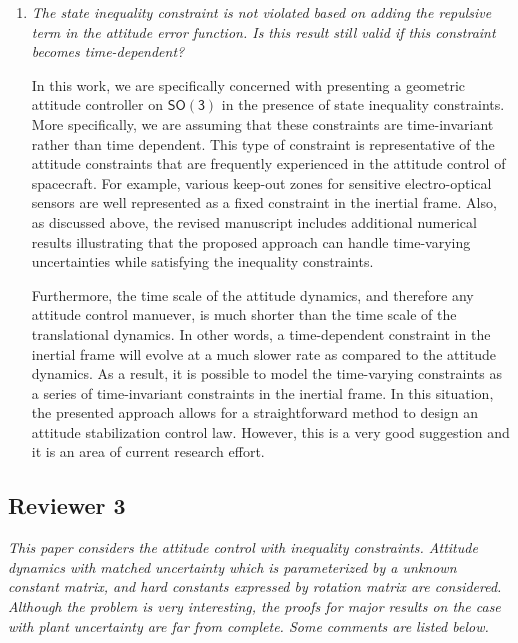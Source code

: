 \documentclass[11pt]{article}
\newcommand{\SO}{\ensuremath{\mathsf{SO(3)}}}
\begin{document}
\begin{enumerate}
\item \textit{The state inequality constraint is not violated based on adding the repulsive term in the attitude error function. Is this result still valid if this constraint becomes time-dependent?}

In this work, we are specifically concerned with presenting a geometric attitude controller on \( \SO \) in the presence of state inequality constraints.
More specifically, we are assuming that these constraints are time-invariant rather than time dependent. 
This type of constraint is representative of the attitude constraints that are frequently experienced in the attitude control of spacecraft. 
For example, various keep-out zones for sensitive electro-optical sensors are well represented as a fixed constraint in the inertial frame. 
Also, as discussed above, the revised manuscript includes additional numerical results illustrating that the proposed approach can handle time-varying uncertainties while satisfying the inequality constraints.

Furthermore, the time scale of the attitude dynamics, and therefore any attitude control manuever, is much shorter than the time scale of the translational dynamics.
In other words, a time-dependent constraint in the inertial frame will evolve at a much slower rate as compared to the attitude dynamics. 
As a result, it is possible to model the time-varying constraints as a series of time-invariant constraints in the inertial frame. 
In this situation, the presented approach allows for a straightforward method to design an attitude stabilization control law. 
However, this is a very good suggestion and it is an area of current research effort.

\end{enumerate}

\subsection*{Reviewer 3}

\textit{This paper considers the attitude control with inequality constraints. Attitude dynamics with matched uncertainty which is parameterized by a unknown constant matrix, and hard constants expressed by rotation matrix are considered. Although the problem is very interesting, the proofs for major results on the case with plant uncertainty are far from complete. Some comments are listed below.}
\end{document}
